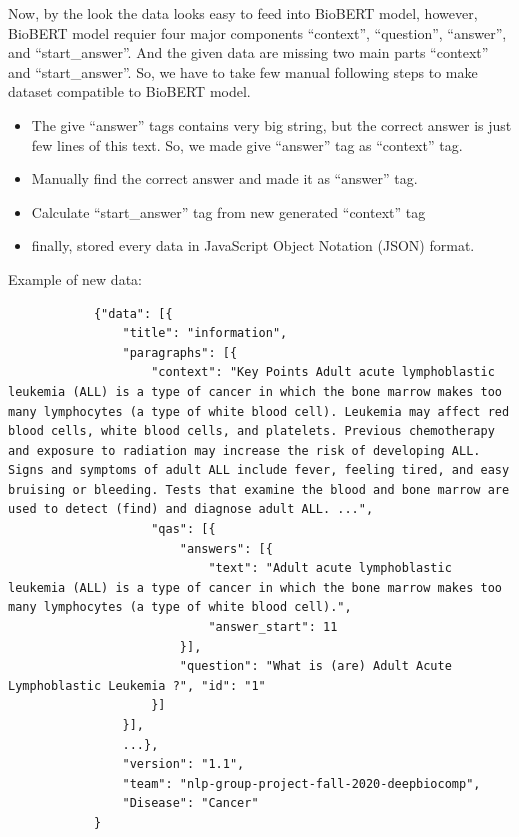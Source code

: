 		Now, by the look the data looks easy to feed into BioBERT model, however, BioBERT model requier four major components ``context'', ``question'', ``answer'', and ``start\_answer''. And the given data are missing two main parts ``context'' and ``start\_answer''. So, we have to take few manual following steps to make dataset compatible to BioBERT model.
		\begin{itemize}
			\item The give ``answer'' tags contains very big string, but the correct answer is just few lines of this text. So, we made give ``answer'' tag as ``context'' tag.
			\item Manually find the correct answer and made it as ``answer'' tag.
			\item Calculate ``start\_answer''  tag from new generated ``context'' tag
			\item finally, stored every data in JavaScript Object Notation (JSON) format.
		\end{itemize}
	
		Example of new data:
		\begin{lstlisting}
			{"data": [{
				"title": "information", 
				"paragraphs": [{
					"context": "Key Points Adult acute lymphoblastic leukemia (ALL) is a type of cancer in which the bone marrow makes too many lymphocytes (a type of white blood cell). Leukemia may affect red blood cells, white blood cells, and platelets. Previous chemotherapy and exposure to radiation may increase the risk of developing ALL. Signs and symptoms of adult ALL include fever, feeling tired, and easy bruising or bleeding. Tests that examine the blood and bone marrow are used to detect (find) and diagnose adult ALL. ...", 
					"qas": [{
						"answers": [{
							"text": "Adult acute lymphoblastic leukemia (ALL) is a type of cancer in which the bone marrow makes too many lymphocytes (a type of white blood cell).", 
							"answer_start": 11
						}], 
						"question": "What is (are) Adult Acute Lymphoblastic Leukemia ?", "id": "1"
					}]
				}],
				...}, 
				"version": "1.1", 
				"team": "nlp-group-project-fall-2020-deepbiocomp", 
				"Disease": "Cancer"
			}
		\end{lstlisting}